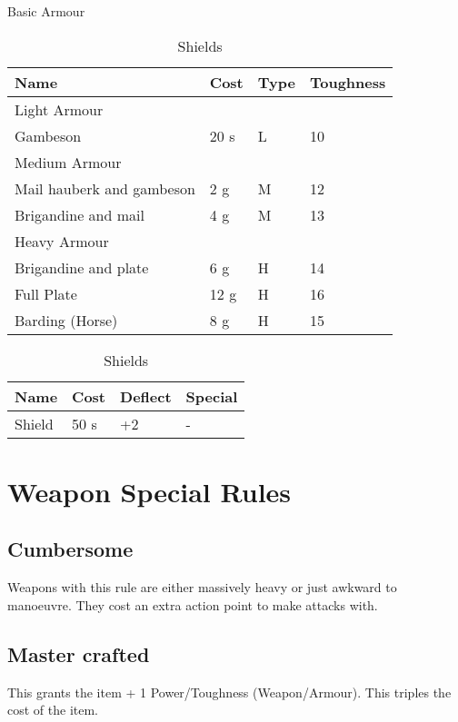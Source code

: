 \begin{table}[ht]
	\centering
	\caption{Basic Armour}
	\begin{tabular}{|l|l|l|l|}
		\hline
		Name  & Cost & Type & Toughness\\
		\hline
		Light Armour & & &  \\
		\hline
		Gambeson & 20 s & L & 10  \\
		\hline
		Medium Armour & & &  \\
		\hline
		Mail hauberk and gambeson & 2 g & M & 12   \\ 
		Brigandine and mail  & 4 g & M & 13  \\
		\hline
		Heavy Armour & & &  \\
		\hline
		Brigandine and plate & 6 g & H & 14 \\
		Full Plate  & 12 g & H & 16  \\
		\hline
		Barding (Horse)& 8 g & H & 15 \\
		\hline
	\end{tabular}
	\caption{Shields}
	\begin{tabular}{|l|l|l|l|}
		\hline
		Name & Cost & Deflect & Special\\   
		\hline
		Shield & 50 s & +2 & - \\
		\hline
	\end{tabular}
\end{table}





\section{Weapon Special Rules}

\subsection{Cumbersome}
Weapons with this rule are either massively heavy or just awkward to manoeuvre. They cost an extra action point to make attacks with.

\subsection{Master crafted}
This grants the item + 1 Power/Toughness (Weapon/Armour). This triples the cost of the item. 

